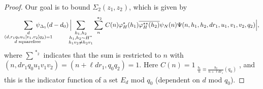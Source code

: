 \documentclass{amsart}
\numberwithin{equation}{section}
\begin{document}
 
\begin{proof}
Our goal is to bound $\Sigma_2(z_1,z_2)$, which is given by 
\begin{align*}
 \sum_{\substack{d  \\ (d,r_1q_0u_1[v_1,v_2]q_2)=1 \\ d \mbox{\begin{scriptsize}
squarefree
\end{scriptsize}}
}} \!\!\!\!\!\!\!\!\!\!\!\!\!\!\!\!\!\psi_{\Delta_1}(d-d_0)\, \Big|\!\!\!\! \sum_{\substack{h_1, h_2 \\ h_1, h_2 \sim H^*  \\ h_1 v_2 \neq h_2v_1 }}  \sum_{\substack{n }}^{\,\,*_2}\,C(n)\varphi^{\star}_H(h_1) \overline{\varphi^{\star\star}_H(h_2)}\psi_N(n)  \Psi(n,h_1,h_2,dr_1,u_1,v_1,v_2,q_2) \Big|,
\end{align*}
where $\sum\limits^{\,\,*_2}$ indicates that the sum is restricted to $n$ with  $(n,dr_1q_0u_1v_1v_2  )=(n+\ell dr_1, q_0q_2)=1$. 
 Here $C(n) = 1_{\substack{\frac{b_1}{n}  \equiv \frac{b_2}{n+\ell d r_1} (q_0)}}
$, and this is the indicator function of a set $E_d$ mod $q_0$ (dependent on  $d$ mod $q_0$). 


\end{proof}
\end{document}
